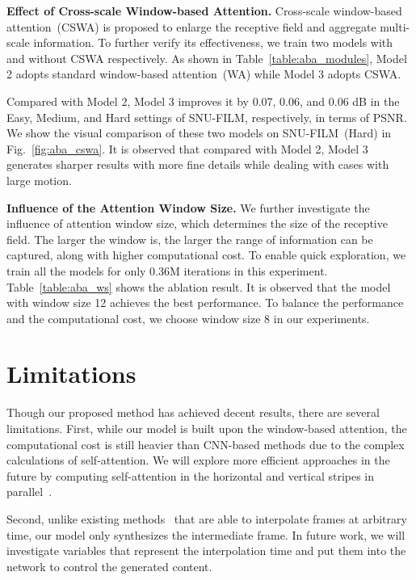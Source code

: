 \documentclass[10pt,twocolumn,letterpaper]{article}
\begin{document}
	
		\vspace{0.05in}
	\noindent\textbf{Effect of Cross-scale Window-based Attention. } Cross-scale window-based attention~(CSWA) is proposed to enlarge the receptive field and aggregate multi-scale information. 
	To further verify its effectiveness, we train two models with and without CSWA respectively. As shown in Table~\ref{table:aba_modules}, Model 2 adopts standard window-based attention~(WA) while Model 3 adopts CSWA.
	
	Compared with Model 2, Model 3 improves it by 0.07, 0.06, and 0.06 dB in the Easy, Medium, and Hard settings of SNU-FILM, respectively, in terms of PSNR. 
	We show the visual comparison of these two models on SNU-FILM~(Hard) in Fig.~\ref{fig:aba_cswa}. It is observed that compared with Model 2, Model 3 generates sharper results with more fine details while dealing with cases with large motion.


	
		\vspace{0.05in}
	\noindent\textbf{Influence of the Attention Window Size. } We further investigate the influence of attention window size, which determines the size of the receptive field. The larger the window is, the larger the range of information can be captured, along with higher computational cost. To enable quick exploration, we train all the models for only 0.36M iterations in this experiment. Table~\ref{table:aba_ws} shows the ablation result. It is observed that the model with window size 12 achieves the best performance. To balance the performance and the computational cost, we choose window size 8 in our experiments.
	
	
	
	
\section{Limitations}
	
	Though our proposed method has achieved decent results, there are several limitations. First, while our model is built upon the window-based attention, the computational cost is still heavier than CNN-based methods due to the complex calculations of self-attention. We will explore more efficient approaches in the future by computing self-attention in the horizontal and vertical stripes in parallel~\cite{dong2021cswin}. 
	
	Second, unlike existing methods~\cite{jiang2018super,asymmetric} that are able to interpolate frames at arbitrary time, our model only synthesizes the intermediate frame. In future work, we will investigate variables that represent the interpolation time and put them into the network to control the generated content.
	
\end{document}
